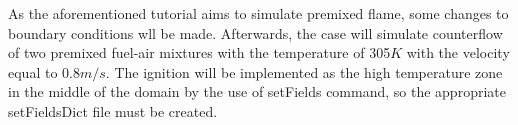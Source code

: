 \documentclass[12pt,english]{article}
\begin{document}
As the aforementioned tutorial aims to simulate premixed flame, some changes to boundary conditions wll be made. Afterwards, the case will simulate counterflow of two premixed fuel-air mixtures with the temperature of 305$K$ with the velocity equal to 0.8$m/s$. The ignition will be implemented as the high temperature zone in the middle of the domain by the use of setFields command, so the appropriate setFieldsDict file must be created.
\end{document}
